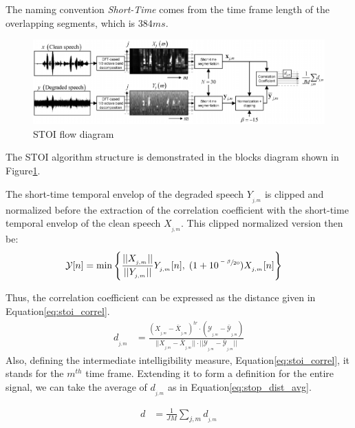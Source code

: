 The naming convention \emph{Short-Time} comes from the time frame length
of the overlapping segments, which is \(384 ms\).  
\begin{figure}[H]
    \centering
    \includegraphics[width=\linewidth]{Features/images/stoi_blocks_diagram}
    \caption{STOI flow diagram}\label{fig:stoi_blocks_diagram}
\end{figure}

The STOI algorithm structure is demonstrated in 
the blocks diagram shown in Figure\;\ref{fig:stoi_blocks_diagram}. 

The short-time temporal envelop of the degraded
speech \(Y_{_{j,m}}\) is clipped and normalized
before the extraction of the correlation coefficient
with the short-time temporal envelop of the
clean speech \(X_{_{j,m}}\).
This clipped normalized version then be:
\begin{align}
    \mathcal{Y}[n] & = \min\Bigg\{ 
            \frac{||X_{_{j,m}}||}{||Y_{_{j,m}}||} Y_{_{j,m}}[n]
            ,\; (1+10^{\sfrac{-\beta}{20}})X_{_{j,m}}[n]
        \Bigg\}
\end{align}

Thus, the correlation coefficient can be expressed as the
distance given in Equation\;\ref{eq:stoi_correl}.
\begin{align}\label{eq:stoi_correl}
    d_{_{j,m}} & = \frac{
            (X_{_{j,m}}-\bar{X}_{_{j,m}})^{tr} 
            \cdot (\mathcal{Y}_{_{j,m}}-\bar{\mathcal{Y}}_{_{j,m}})
        }
        {
            ||X_{_{j,m}}-\bar{X}_{_{j,m}}||
            \cdot ||\mathcal{Y}_{_{j,m}}-\bar{\mathcal{Y}}_{_{j,m}}|| 
        }
\end{align}
Also, defining the intermediate intelligibility measure, 
Equation\;\ref{eq:stoi_correl}, it stands for the
\(m^{th}\) time frame. Extending it to form
a definition for the entire signal,
we can take the average of \(d_{_{j,m}}\)
as in Equation\;\ref{eq:stop_dist_avg}.

\begin{align}\label{eq:stop_dist_avg}
    d & = \frac{1}{JM} \sum_{j,m} d_{_{j,m}}
\end{align}

